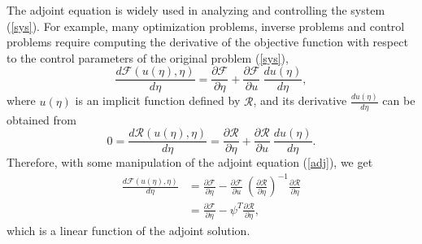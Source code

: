 \documentclass[a4paper,11pt]{article}
\theoremstyle{remark}
\theoremstyle{definition}
\begin{document}
    The adjoint equation is widely used in analyzing and
    controlling the system (\ref{sys}).  For example, many
    optimization problems, inverse problems and control problems require
    computing the derivative of the objective function with respect to
    the control parameters of the original problem (\ref{sys}),
    \[ \frac{d\mathcal{F}(u(\eta),\eta)}{d\eta}
        = \frac{\partial \mathcal{F}}{\partial \eta} +
          \frac{\partial \mathcal{F}}{\partial u} \: \frac{d u(\eta)}{d \eta},
    \]
    where $u(\eta)$ is an implicit function defined by $\mathcal{R}$, and its
    derivative
    $\frac{d u(\eta)}{d \eta}$ can be obtained from
    \[ 0 = \frac{d\mathcal{R}(u(\eta),\eta)}{d\eta}
         = \frac{\partial \mathcal{R}}{\partial \eta} +
           \frac{\partial \mathcal{R}}{\partial u} \: \frac{d u(\eta)}{d \eta}.
    \]
    Therefore, with some manipulation of the adjoint equation (\ref{adj}),
    we get
    \begin{equation}\label{impder} \begin{split}
        \frac{d\mathcal{F}(u(\eta),\eta)}{d\eta}
        &= \frac{\partial \mathcal{F}}{\partial \eta} -
           \frac{\partial \mathcal{F}}{\partial u} \:
           \left( \frac{\partial \mathcal{R}}{\partial \eta} \right)^{-1}
           \frac{\partial \mathcal{R}}{\partial \eta} \\
        &= \frac{\partial \mathcal{F}}{\partial \eta} -
           \psi^T \frac{\partial \mathcal{R}}{\partial \eta} ,
    \end{split} \end{equation}
    which is a linear function of the adjoint solution.
    
\end{document}
